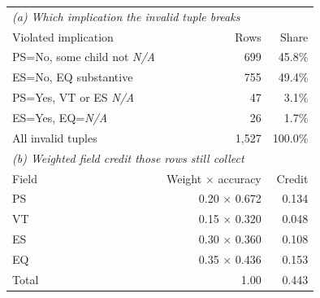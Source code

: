 \begin{tabular}{lrr}
\toprule
\multicolumn{3}{l}{\emph{(a) Which implication the invalid tuple breaks}} \\
Violated implication & Rows & Share \\
\midrule
\textsf{PS}=No, some child not \emph{N/A} & 699 & 45.8\% \\
\textsf{ES}=No, \textsf{EQ} substantive & 755 & 49.4\% \\
\textsf{PS}=Yes, \textsf{VT} or \textsf{ES} \emph{N/A} & 47 & 3.1\% \\
\textsf{ES}=Yes, \textsf{EQ}=\emph{N/A} & 26 & 1.7\% \\
\midrule
All invalid tuples & 1{,}527 & 100.0\% \\
\midrule
\multicolumn{3}{l}{\emph{(b) Weighted field credit those rows still collect}} \\
Field & Weight $\times$ accuracy & Credit \\
\midrule
\textsf{PS} & 0.20 $\times$ 0.672 & 0.134 \\
\textsf{VT} & 0.15 $\times$ 0.320 & 0.048 \\
\textsf{ES} & 0.30 $\times$ 0.360 & 0.108 \\
\textsf{EQ} & 0.35 $\times$ 0.436 & 0.153 \\
\midrule
Total & 1.00 & 0.443 \\
\bottomrule
\end{tabular}
